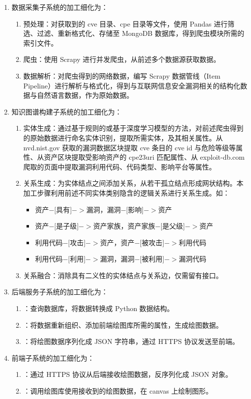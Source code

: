 \documentclass[a4paper,AutoFakeBold,oneside,12pt]{book}
\begin{document}
\begin{enumerate}
	\item 数据采集子系统的加工细化为：
	      \begin{enumerate}
		      \item 预处理：对获取到的 cve 目录、cpe 目录等文件，使用 Pandas 进行筛选、过滤、重新格式化、存储至 MongoDB 数据库，得到爬虫模块所需的索引文件。
		      \item 爬虫：使用 Scrapy 进行并发爬虫，从前述多个数据源获取数据。
		      \item 数据解析：对爬虫得到的网络数据，编写 Scrapy 数据管线（Item Pipeline）进行解析与格式化，得到与互联网信息安全漏洞相关的结构化数据与自然语言数据，作为原始数据。
	      \end{enumerate}
	\item 知识图谱构建子系统的加工细化为：
	      \begin{enumerate}
		      \item 实体生成：通过基于规则的或基于深度学习模型的方法，对前述爬虫得到的原始数据进行命名实体识别，提取所需实体，及其相关属性。从 nvd.nist.gov 获取的漏洞数据区块提取 cve 条目的 cve id 与危险等级等属性、从资产区块提取受影响资产的 cpe23uri 匹配属性、从 exploit-db.com 爬取的页面中提取漏洞利用代码、代码类型、影响平台等属性。
		      \item 关系生成：为实体结点之间添加关系，从若干孤立结点形成网状结构。本加工步骤利用前述不同实体类别隐含的逻辑关系进行关系生成。如：
		            \begin{itemize}
			            \item 资产$-[$具有$]->$漏洞，漏洞$-[$影响$]->$资产
			            \item 资产$-[$是子级$]->$资产家族，资产家族$-[$是父级$]->$资产
			            \item 利用代码$-[$攻击$]->$资产，资产$-[$被攻击$]->$利用代码
			            \item 利用代码$-[$利用$]->$漏洞，漏洞$-[$被利用$]->$漏洞代码
		            \end{itemize}
		      \item 关系融合：消除具有二义性的实体结点与关系边，仅需留有接口。
	      \end{enumerate}
	\item 后端服务子系统的加工细化为：
	      \begin{enumerate}
		      \item ：查询数据库，将数据转换成 Python 数据结构。
		      \item ：将数据重新组织、添加前端绘图库所需的属性，生成绘图数据。
		      \item ：将绘图数据序列化成 JSON 字符串，通过 HTTPS 协议发送至前端。
	      \end{enumerate}
	\item 前端子系统的加工细化为：
	      \begin{enumerate}
		      \item ：通过 HTTPS 协议从后端接收绘图数据，反序列化成 JSON 对象。
		      \item ：调用绘图库使用接收到的绘图数据，在 canvas 上绘制图形。
	      \end{enumerate}
\end{enumerate}
\end{document}
